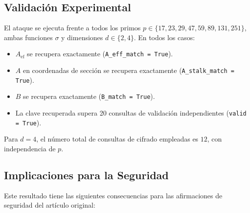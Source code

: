 \documentclass[12pt,a4paper]{article}
\theoremstyle{definition}
\begin{document}
\subsection{Validación Experimental}

El ataque se ejecuta frente a todos los primos
$p \in \{17, 23, 29, 47, 59, 89, 131, 251\}$, ambas funciones
$\sigma$ y dimensiones $d \in \{2, 4\}$. En todos los casos:

\begin{itemize}
  \item $A_{\text{ef}}$ se recupera exactamente
    (\texttt{A\_eff\_match = True}).
  \item $A$ en coordenadas de sección se recupera exactamente
    (\texttt{A\_stalk\_match = True}).
  \item $B$ se recupera exactamente (\texttt{B\_match = True}).
  \item La clave recuperada supera 20 consultas de validación
    independientes (\texttt{valid = True}).
\end{itemize}

Para $d = 4$, el número total de consultas de cifrado empleadas es
$12$, con independencia de $p$.

\subsection{Implicaciones para la Seguridad}
\label{sub:implicaciones}

Este resultado tiene las siguientes consecuencias para las
afirmaciones de seguridad del artículo original:
\end{document}
